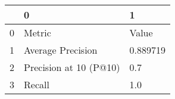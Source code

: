 \begin{tabular}{lll}
\toprule
{} &                       0 &         1 \\
\midrule
0 &                  Metric &     Value \\
1 &       Average Precision &  0.889719 \\
2 &  Precision at 10 (P@10) &       0.7 \\
3 &                  Recall &       1.0 \\
\bottomrule
\end{tabular}
